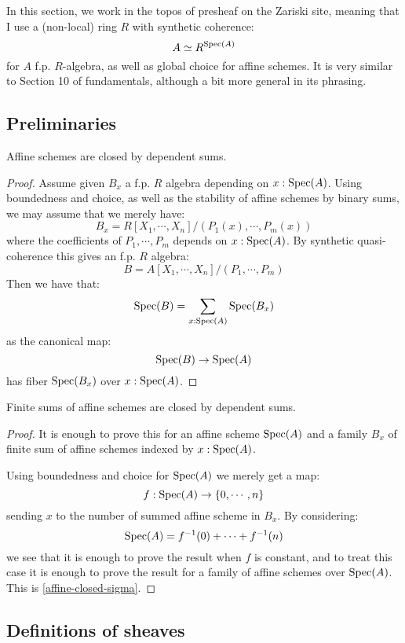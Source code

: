 In this section, we work in the topos of presheaf on the Zariski site, meaning that I use a (non-local) ring $R$ with synthetic coherence:
\[ A \simeq R^{\operatorname{Spec}(A)} \]
for $A$ f.p. $R$-algebra, as well as global choice for affine schemes. It is very similar to Section 10 of fundamentals, although a bit more general in its phrasing.

\subsection{Preliminaries}

\begin{lemma}\label{affine-closed-sigma}
Affine schemes are closed by dependent sums.
\end{lemma}

\begin{proof}
Assume given $B_x$ a f.p. $R$ algebra depending on $x:\operatorname{Spec}(A)$. Using boundedness and choice, as well as the stability of affine schemes by binary sums, we may assume that we merely have:
\[B_x = R[X_1,\cdots,X_n]/(P_1(x),\cdots, P_m(x))\]
where the coefficients of $P_1,\cdots,P_m$ depends on $x:\operatorname{Spec}(A)$. By synthetic quasi-coherence this gives an f.p. $R$ algebra:
\[B = A[X_1,\cdots,X_n]/(P_1,\cdots, P_m)\]
Then we have that:
\[\operatorname{Spec}(B) = \sum_{x:\operatorname{Spec}(A)} \operatorname{Spec}(B_x)\]
as the canonical map:
\[\operatorname{Spec}(B) \to \operatorname{Spec}(A)\]
has fiber $\operatorname{Spec}(B_x)$ over $x:\operatorname{Spec}(A)$.
\end{proof}

\begin{lemma}\label{sum-affine-closed-sigma}
Finite sums of affine schemes are closed by dependent sums.
\end{lemma}

\begin{proof}
It is enough to prove this for an affine scheme $\operatorname{Spec}(A)$ and a family $B_x$ of finite sum of affine schemes indexed by $x:\operatorname{Spec}(A)$.

Using boundedness and choice for $\operatorname{Spec}(A)$ we merely get a map:
\[f:\operatorname{Spec}(A) \to \{0,\cdots,n\}\]
sending $x$ to the number of summed affine scheme in $B_x$. By considering:
\[\operatorname{Spec}(A) = f^{-1}(0) + \cdots + f^{-1}(n)\]
we see that it is enough to prove the result when $f$ is constant, and to treat this case it is enough to prove the result for a family of affine schemes over $\operatorname{Spec}(A)$. This is \cref{affine-closed-sigma}.
\end{proof}

\subsection{Definitions of sheaves}

